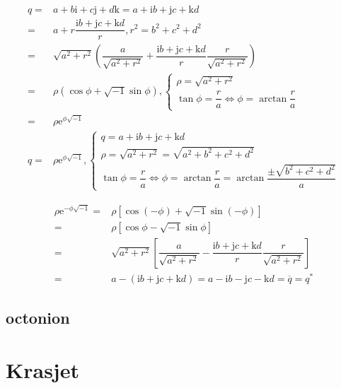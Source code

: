 \documentclass[
]{book}
\theoremstyle{definition}
\theoremstyle{definition}
\theoremstyle{definition}
\theoremstyle{definition}
\theoremstyle{remark}
\begin{document}
\[
\begin{aligned}
q= & a+b\mathrm{i}+c\mathrm{j}+d\mathrm{k}=a+\mathrm{i}b+\mathrm{j}c+\mathrm{k}d\\
= & a+r\dfrac{\mathrm{i}b+\mathrm{j}c+\mathrm{k}d}{r},r^{2}=b^{2}+c^{2}+d^{2}\\
= & \sqrt{a^{2}+r^{2}}\left(\dfrac{a}{\sqrt{a^{2}+r^{2}}}+\dfrac{\mathrm{i}b+\mathrm{j}c+\mathrm{k}d}{r}\dfrac{r}{\sqrt{a^{2}+r^{2}}}\right)\\
= & \rho\left(\cos\phi+\sqrt{-1}\sin\phi\right),\begin{cases}
\rho=\sqrt{a^{2}+r^{2}}\\
\tan\phi=\dfrac{r}{a}\Leftrightarrow\phi=\arctan\dfrac{r}{a}
\end{cases}\\
= & \rho\mathrm{e}^{\phi\sqrt{-1}}\\
q= & \rho\mathrm{e}^{\phi\sqrt{-1}},\begin{cases}
q=a+\mathrm{i}b+\mathrm{j}c+\mathrm{k}d\\
\rho=\sqrt{a^{2}+r^{2}}=\sqrt{a^{2}+b^{2}+c^{2}+d^{2}}\\
\tan\phi=\dfrac{r}{a}\Leftrightarrow\phi=\arctan\dfrac{r}{a}=\arctan\dfrac{\pm\sqrt{b^{2}+c^{2}+d^{2}}}{a}
\end{cases}
\end{aligned}
\]

\[
\begin{aligned}
\rho\mathrm{e}^{-\phi\sqrt{-1}}= & \rho\left[\cos\left(-\phi\right)+\sqrt{-1}\sin\left(-\phi\right)\right]\\
= & \rho\left[\cos\phi-\sqrt{-1}\sin\phi\right]\\
= & \sqrt{a^{2}+r^{2}}\left[\dfrac{a}{\sqrt{a^{2}+r^{2}}}-\dfrac{\mathrm{i}b+\mathrm{j}c+\mathrm{k}d}{r}\dfrac{r}{\sqrt{a^{2}+r^{2}}}\right]\\
= & a-\left(\mathrm{i}b+\mathrm{j}c+\mathrm{k}d\right)=a-\mathrm{i}b-\mathrm{j}c-\mathrm{k}d=\overline{q}=q^{*}
\end{aligned}
\]

\hypertarget{octonion}{%
\subsection{octonion}\label{octonion}}

\hypertarget{krasjet}{%
\section{Krasjet}\label{krasjet}}
\end{document}
